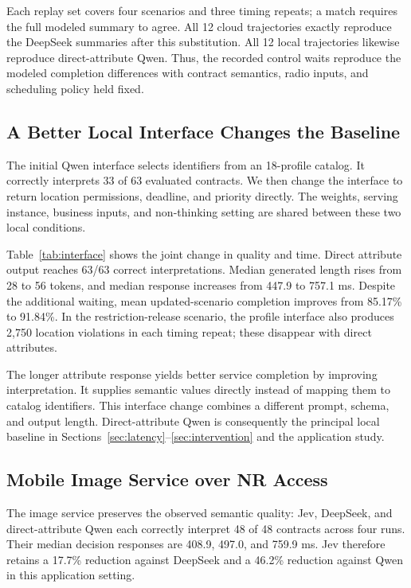 Each replay set covers four scenarios and three timing repeats; a match requires the full modeled summary to agree. All 12 cloud trajectories exactly reproduce the DeepSeek summaries after this substitution. All 12 local trajectories likewise reproduce direct-attribute Qwen. Thus, the recorded control waits reproduce the modeled completion differences with contract semantics, radio inputs, and scheduling policy held fixed.

\subsection{A Better Local Interface Changes the Baseline}
\label{sec:interface}

The initial Qwen interface selects identifiers from an 18-profile catalog. It correctly interprets 33 of 63 evaluated contracts. We then change the interface to return location permissions, deadline, and priority directly. The weights, serving instance, business inputs, and non-thinking setting are shared between these two local conditions.

Table~\ref{tab:interface} shows the joint change in quality and time. Direct attribute output reaches 63/63 correct interpretations. Median generated length rises from 28 to 56 tokens, and median response increases from 447.9 to 757.1 ms. Despite the additional waiting, mean updated-scenario completion improves from 85.17\% to 91.84\%. In the restriction-release scenario, the profile interface also produces 2,750 location violations in each timing repeat; these disappear with direct attributes.

The longer attribute response yields better service completion by improving interpretation. It supplies semantic values directly instead of mapping them to catalog identifiers. This interface change combines a different prompt, schema, and output length. Direct-attribute Qwen is consequently the principal local baseline in Sections~\ref{sec:latency}--\ref{sec:intervention} and the application study.

\subsection{Mobile Image Service over NR Access}
\label{sec:application}

The image service preserves the observed semantic quality: Jev, DeepSeek, and direct-attribute Qwen each correctly interpret 48 of 48 contracts across four runs. Their median decision responses are 408.9, 497.0, and 759.9 ms. Jev therefore retains a 17.7\% reduction against DeepSeek and a 46.2\% reduction against Qwen in this application setting.

